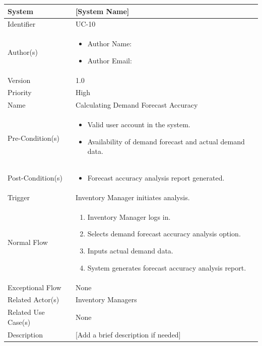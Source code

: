 \begin{center}
	\begin{tabularx}{\textwidth}{|l|X|}
		\hline
		System & [System Name] \\
		\hline
		Identifier & UC-10 \\
		\hline
		Author(s) & \begin{itemize}[left=0pt]
			\item Author Name:
			\item Author Email:
		\end{itemize} \\
		\hline
		Version & 1.0 \\
		\hline
		Priority & High \\
		\hline
		Name & Calculating Demand Forecast Accuracy \\
		\hline
		Pre-Condition(s) &  \begin{itemize}[left=0pt]
			\item Valid user account in the system.
			\item Availability of demand forecast and actual demand data.
		\end{itemize} \\
		\hline
		Post-Condition(s) & \begin{itemize}[left=0pt]
			\item Forecast accuracy analysis report generated.
		\end{itemize} \\
		\hline
		Trigger & Inventory Manager initiates analysis. \\
		\hline
		Normal Flow & \begin{enumerate}[left=0pt]
			\item Inventory Manager logs in.
			\item Selects demand forecast accuracy analysis option.
			\item Inputs actual demand data.
			\item System generates forecast accuracy analysis report.
		\end{enumerate} \\
		\hline
		Exceptional Flow & None \\
		\hline
		Related Actor(s) & Inventory Managers \\
		\hline
		Related Use Case(s) & None \\
		\hline
		Description & [Add a brief description if needed] \\
		\hline
	\end{tabularx}
\end{center}




